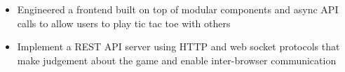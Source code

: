 
\begin{itemize}
  \item Engineered a frontend built on top of modular components and async
  API calls to allow users to play tic tac toe with others
  \item Implement a REST API server using HTTP and web socket protocols that
  make judgement about the game and enable inter-browser communication
\end{itemize}

